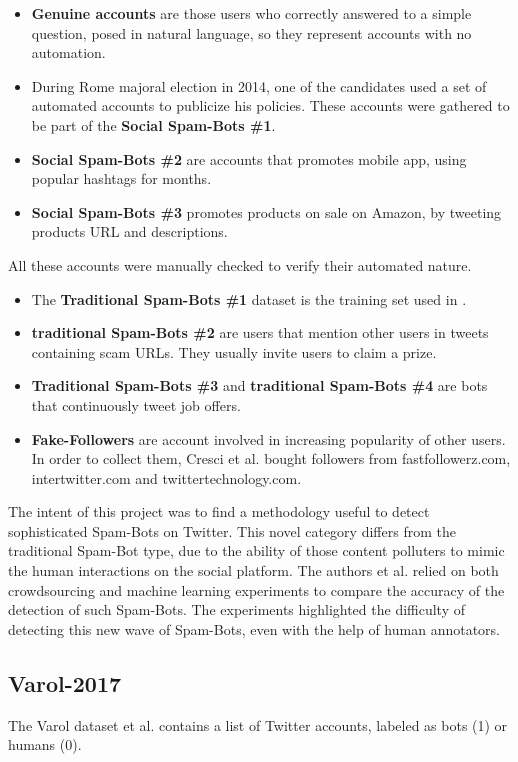 \normalsize
\begin{itemize}
	\item \textbf{Genuine accounts} are those users who correctly answered to a simple question, posed in natural language, so they represent accounts with no automation.
	\item  During Rome majoral election in 2014, one of the candidates used a set of automated accounts to publicize his policies. These accounts were gathered to be part of the \textbf{Social Spam-Bots \#1}.
	\item \textbf{Social Spam-Bots \#2} are accounts that promotes mobile app, using popular hashtags for months.
	\item  \textbf{Social Spam-Bots \#3} promotes products on sale on Amazon, by tweeting products URL and descriptions.
\end{itemize}
All these accounts were manually checked to verify their automated nature.

\begin{itemize}
	\item The \textbf{Traditional Spam-Bots \#1} dataset is the training set used in \cite{Yang}.
	\item \textbf{traditional Spam-Bots \#2} are users that mention other users in tweets containing scam URLs. They usually invite users to claim a prize.
	\item \textbf{Traditional Spam-Bots \#3} and \textbf{traditional Spam-Bots \#4} are bots that continuously tweet job offers.
	\item \textbf{Fake-Followers} are account involved in increasing popularity of other users. In order to collect them, Cresci et al. \cite{Cresci} bought followers from fastfollowerz.com, intertwitter.com and twittertechnology.com.
\end{itemize}

The intent of this project was to find a methodology useful to detect sophisticated Spam-Bots on Twitter. This novel category differs from the traditional Spam-Bot type, due to the ability of those content polluters to mimic the human interactions on the social platform. The authors et al. \cite{Cresci} relied on both crowdsourcing and machine learning experiments to compare the accuracy of the detection of such Spam-Bots. The experiments highlighted the difficulty of detecting this new wave of Spam-Bots, even with the help of human annotators.


\subsection{Varol-2017}
The Varol dataset et al. \cite{Varol} contains a list of Twitter accounts, labeled as bots (1) or humans (0).


